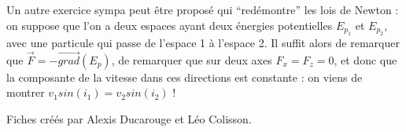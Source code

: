 \documentclass[9pt]{article}
\begin{document}
\begin{multicols*}{2}
Un autre exercice sympa peut être proposé qui ``redémontre'' les lois de Newton : on suppose que l'on a deux espaces ayant deux énergies potentielles $E_{p_1}$ et $E_{p_2}$, avec une particule qui passe de l'espace 1 à l'espace 2. Il suffit alors de remarquer que $\overrightarrow{F}=-\overrightarrow{grad}(E_p)$, de remarquer que sur deux axes $F_x=F_z=0$, et donc que la composante de la vitesse dans ces directions est constante : on viens de montrer $v_1sin(i_1)=v_2sin(i_2)$ !

\vfill
\footnotesize{Fiches créés par Alexis Ducarouge et Léo Colisson.}

\end{multicols*}
\end{document}
